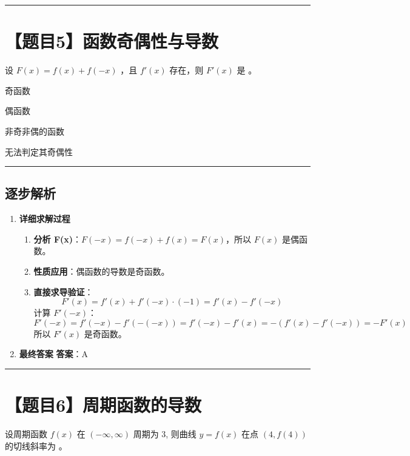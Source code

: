 \documentclass[UTF8]{ctexart}
\newenvironment{redenv}{\color{red}}{}
\newenvironment{detailedanalysis}{%
    \color{red}
    \begin{enumerate}[label=\textbf{第\arabic*步：}, leftmargin=*, align=left, itemsep=1.5ex]
}{%
    \end{enumerate}
}
\newcommand{\problemrule}{\noindent\rule{\textwidth}{1.5pt}\vspace{-0.8em}}
\newcommand{\analysisrule}{\noindent\rule{\textwidth}{0.8pt}\vspace{-0.8em}}
\newcommand{\choicesTwo}[4]{
    \begin{enumerate}[label=\Alph*., itemsep=0pt, parsep=0pt, topsep=5pt, labelsep=0.5em]
        \begin{minipage}{0.45\linewidth} \item #1 \end{minipage}
        \begin{minipage}{0.45\linewidth} \item #2 \end{minipage}
        \begin{minipage}{0.45\linewidth} \item #3 \end{minipage}
        \begin{minipage}{0.45\linewidth} \item #4 \end{minipage}
    \end{enumerate}
}
\newcommand{\blank}[1]{\underline{\hspace{#1}}}
\begin{document}
\problemrule
\section*{【题目5】函数奇偶性与导数}
设 $ F(x)=f(x)+f(-x) $ ，且 $ f'(x) $ 存在，则 $ F'(x) $ 是 \blank{1cm}。
\choicesTwo
{奇函数}
{偶函数}
{非奇非偶的函数}
{无法判定其奇偶性}

\begin{redenv}
\analysisrule
\subsection*{逐步解析}

\begin{detailedanalysis}
\item \textbf{详细求解过程}
\begin{enumerate}[label=(\arabic*)]
\item \textbf{分析 F(x)}：$F(-x) = f(-x) + f(x) = F(x)$，所以 $F(x)$ 是偶函数。
\item \textbf{性质应用}：偶函数的导数是奇函数。
\item \textbf{直接求导验证}：
$$ F'(x) = f'(x) + f'(-x) \cdot (-1) = f'(x) - f'(-x) $$
计算 $F'(-x)$：
$$ F'(-x) = f'(-x) - f'(-(-x)) = f'(-x) - f'(x) = -(f'(x) - f'(-x)) = -F'(x) $$
所以 $F'(x)$ 是奇函数。
\end{enumerate}

\item \textbf{最终答案}
\textbf{答案}：A
\end{detailedanalysis}
\end{redenv}

\problemrule
\section*{【题目6】周期函数的导数}
设周期函数 $ f(x) $ 在 $ (-\infty, \infty) $ 周期为 3, 则曲线 $ y = f(x) $ 在点 $ (4, f(4)) $ 的切线斜率为 \blank{2cm}。
\end{document}
